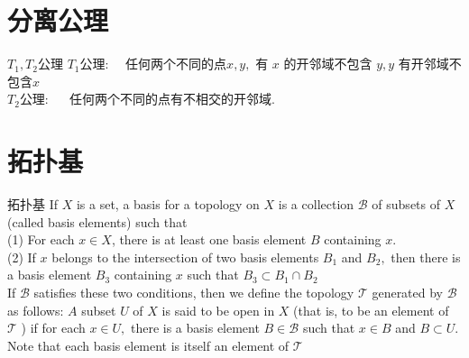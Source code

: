 \chapter{分离公理}
\begin{definition}{$T_{1},T_{2}$公理}
\noindent $T_{1}$公理:$\quad$ 任何两个不同的点$x, y,$ 有 $x$ 的开邻域不包含 $y, y$ 有开邻域不包含$x$\\
$T_{2}$公理: $\quad$ 任何两个不同的点有不相交的开邻域.
\end{definition}


\chapter{拓扑基}
\begin{definition}{拓扑基}
\noindent If $X$ is a set, a basis for a topology on $X$ is a collection $\mathscr{B}$ of subsets of $X$ (called basis elements) such that\\
(1) For each $x \in X$, there is at least one basis element $B$ containing $x$.\\
(2) If $x$ belongs to the intersection of two basis elements $B_{1}$ and $B_{2},$ then there is a basis element $B_{3}$ containing $x$ such that $B_{3} \subset B_{1} \cap B_{2}$ \\
If $\mathscr{B}$ satisfies these two conditions, then we define the topology $\boldsymbol{\mathcal { T }}$ generated by $\mathcal{B}$ as follows: $A$ subset $U$ of $X$ is said to be open in $X$ (that is, to be an element of $\mathcal{T}$ ) if for each $x \in U,$ there is a basis element $B \in \mathscr{B}$ such that $x \in B$ and $B \subset U .$ Note that each basis element is itself an element of $\mathcal{T}$
\end{definition}